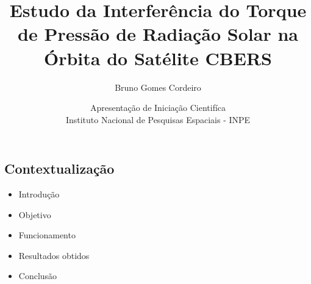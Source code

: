 \documentclass{beamer}
\title[Estudo da Interferência do Torque de Pressão de Radiação Solar na Órbita do Satélite CBERS]{\Huge{Estudo da Interferência do Torque de Pressão de Radiação Solar na Órbita do Satélite CBERS}}
\author[Bruno] {Bruno Gomes Cordeiro \\
  \text{\scriptsize{bru020@usp.br}}}
\date[EEL-USP]{\scriptsize{Apresentação de Iniciação Cientifíca} \\ Instituto Nacional de Pesquisas Espaciais - INPE}
\begin{document}
  \begin{frame}
    \titlepage
  \end{frame}

\begin{frame}

  \section{Contextualização}
  \begin{tcolorbox}[colback=yellow!10!white,colframe=black!70!white,title=Tópicos abordados]
    \begin{itemize}

    \item[{\textcolor{orange!30!white}{\ding{192}}}] Introdução
      \pause
    \item[{\textcolor{orange!50!white}{\ding{193}}}] Objetivo
      \pause
    \item[{\textcolor{orange!70!white}{\ding{194}}}] Funcionamento
      \pause
    \item[{\textcolor{orange!90!white}{\ding{195}}}] Resultados obtidos
      \pause
    \item[{\textcolor{orange!100!white}{\ding{195}}}] Conclusão
    \end{itemize}
  \end{tcolorbox}




\end{frame}
\end{document}
